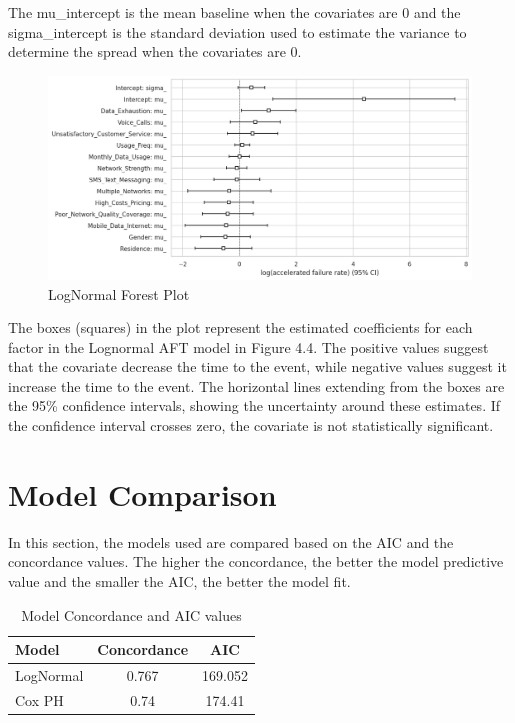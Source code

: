 \documentclass[doublespacing]{report} %
\begin{document}
The mu_intercept is the mean baseline when the covariates are 0 and the sigma_intercept is the standard deviation used to estimate the variance to determine the spread when the covariates are 0.

\begin{figure}[H]
    \centering
    \includegraphics[width=1\linewidth]{Figure 4/4.4.png}
    \caption{LogNormal Forest Plot}
\end{figure}

The boxes (squares) in the plot represent the estimated coefficients for each factor in the Lognormal AFT model in Figure 4.4. The positive values suggest that the covariate decrease the time to the event, while negative values suggest it increase the time to the event. The horizontal lines extending from the boxes are the 95\% confidence intervals, showing the uncertainty around these estimates. If the confidence interval crosses zero, the covariate is not statistically significant.

\section{Model Comparison}

In this section, the models used are compared based on the AIC and the concordance values. The higher the concordance, the better the model predictive value and the smaller the AIC, the better the model fit.

	\begin{table}[H]
			\centering
			\begin{tabular}{lcc}
				\toprule
				\textbf{Model} & \textbf{Concordance} & \textbf{AIC} \\
				\midrule
				LogNormal& 0.767& 169.052\\
				Cox PH & 0.74& 174.41\\
				\bottomrule
			\end{tabular}
			\caption{Model Concordance and AIC values}
			\label{Table 2}
			
		\end{table}
\end{document}
